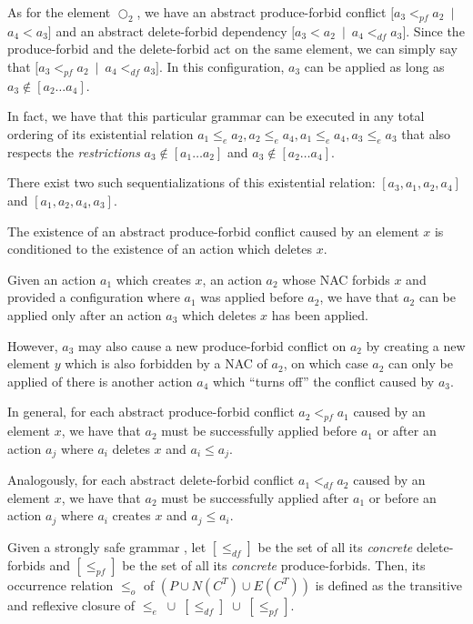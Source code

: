 \begin{example}
  As for the element $\Circle_2$, we have an abstract produce-forbid conflict \mbox{$[a_3 <_{pf} a_2$ $|$ $a_4 < a_3]$} and an abstract delete-forbid dependency \mbox{$[a_3 < a_2$ $|$ $a_4 <_{df} a_3]$}. Since the produce-forbid and the delete-forbid act on the same element, we can simply say that \mbox{$[a_3 <_{pf} a_2$ $|$ $a_4 <_{df} a_3]$}. In this configuration, $a_3$ can be applied as long as $a_3 \not\in [a_2\ldots a_4]$.

  In fact, we have that this particular grammar can be executed in any total ordering of its existential relation $a_1 \leq_e a_2, a_2 \leq_e a_4, a_1 \leq_e a_4, a_3 \leq_e a_3$ that also respects the \emph{restrictions} $a_3 \not\in [a_1\ldots a_2]$ and $a_3 \not\in [a_2\ldots a_4]$.

  There exist two such sequentializations of this existential relation: $[a_3, a_1, a_2, a_4]$ and $[a_1,a_2,a_4,a_3]$.
\end{example}

\begin{remark} The existence of an abstract produce-forbid conflict caused by an element $x$ is conditioned to the existence of an action which deletes $x$.

  Given an action $a_1$ which creates $x$, an action $a_2$ whose NAC forbids $x$ and provided a configuration where $a_1$ was applied before $a_2$, we have that $a_2$ can be applied only after an action $a_3$ which deletes $x$ has been applied.

  However, $a_3$ may also cause a new produce-forbid conflict on $a_2$ by creating a new element $y$ which is also forbidden by a NAC of $a_2$, on which case $a_2$ can only be applied of there is another action $a_4$ which ``turns off'' the conflict caused by $a_3$.

  In general, for each abstract produce-forbid conflict $a_2 <_{pf} a_1$ caused by an element $x$, we have that $a_2$ must be successfully applied before $a_1$ or after an action $a_{j}$ where $a_i$ deletes $x$ and $a_i \leq a_j$.

  Analogously, for each abstract delete-forbid conflict $a_1 <_{df} a_2$ caused by an element $x$, we have that $a_2$ must be successfully applied after $a_1$ or before an action $a_j$ where $a_i$ creates $x$ and $a_j \leq a_i$.
\end{remark}

\begin{definition} Given a strongly safe grammar \doublyTypedGraphGrammarCore{}, let $[\leq_{df}]$ be the set of all its \emph{concrete} delete-forbids and $[\leq_{pf}]$ be the set of all its \emph{concrete} produce-forbids. Then, its occurrence relation $\leq_o$ of $(P \cup N(C^T) \cup E(C^T))$ is defined as the transitive and reflexive closure of \mbox{$\leq_{e}$ $\cup$ $[\leq_{df}]$ $\cup$ $[\leq_{pf}]$}.
\end{definition}

